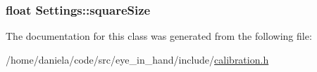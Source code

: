 \hypertarget{classSettings_a6c94708776ad1ce258fc44f2101f5941}{
\subsubsection[{square\-Size}]{\setlength{\rightskip}{0pt plus 5cm}float Settings\-::square\-Size}}\label{classSettings_a6c94708776ad1ce258fc44f2101f5941}


The documentation for this class was generated from the following file\-:\begin{DoxyCompactItemize}
\item 
/home/daniela/code/src/eye\-\_\-in\-\_\-hand/include/\hyperlink{calibration_8h}{calibration.\-h}\end{DoxyCompactItemize}
